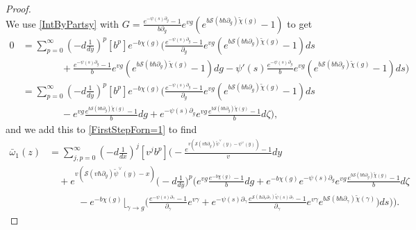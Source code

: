 \documentclass[10pt,a4paper,oneside,no-math,reqno]{amsart}%
\theoremstyle{plain}
\theoremstyle{definition}
\theoremstyle{remark}
\numberwithin{equation}{section}
\newcommand{\mc}[1]{\mathcal{#1}}
\newcommand{\1}{\mathds{1}}
\newcommand{\<}{\langle}
\renewcommand{\>}{\rangle}
\newcommand{\del}{\partial}
\begin{document}
\begin{proof}
\begin{equation}
	\end{equation}
	We use \cref{IntByPartsy} with $ G = \frac{e^{-\psi (s) \del_g} - 1}{b \del_g} e^{vg} (e^{b \mc{S}(b \hbar \del_g) \tilde{\chi} (g)} - 1)$ to get
	\begin{equation}
    \begin{split}
        0
        &=
        \sum_{p=0}^\infty ( - d \frac{1}{dy} )^p [b^p] e^{-b \chi (g)} \Big(
        \frac{e^{-\psi (s) \del_g} - 1}{\del_g} e^{vg} (e^{b \mc{S}(b \hbar \del_g) \tilde{\chi} (g)} - 1) ds
        \\
        &\qquad \qquad
        +
        \frac{e^{-\psi (s) \del_g} - 1}{b} e^{vg} (e^{b \mc{S}(b \hbar \del_g) \tilde{\chi} (g)} - 1) dg
        -
        \psi'(s) \frac{e^{-\psi (s) \del_g}}{b} e^{vg} (e^{b \mc{S}(b \hbar \del_g) \tilde{\chi} (g)} - 1)ds \Big)
        \\
        &=
        \sum_{p=0}^\infty ( - d \frac{1}{dy} )^p [b^p] e^{-b \chi (g)} \Big(
        \frac{e^{-\psi (s) \del_g} - 1}{\del_g} e^{vg} (e^{b \mc{S}(b \hbar \del_g) \tilde{\chi} (g)} - 1) ds 
       	\\
       	&\qquad \qquad
        -
        e^{vg} \frac{e^{b \mc{S}(b \hbar \del_g) \tilde{\chi} (g)} - 1}{b} dg
        +
        e^{-\psi (s) \del_g}e^{vg} \frac{e^{b \mc{S}(b \hbar \del_g) \tilde{\chi} (g)} - 1}{b} d\zeta
        \Big) ,
    \end{split}
	\end{equation}
	and we add this to \cref{FirstStepForn=1} to find
	\begin{equation}
		\begin{split}
			\bar{\omega}_1 (z)
      &=
      \sum_{j,p=0}^\infty (-d \frac{1}{dx})^j [v^j b^p ] 
			\Bigg(
      - \frac{e^{v ( \mc{S}(v\hbar \del_{y}) \tilde{\psi}^\vee(y) - \psi^\vee (y) )} - 1}{v} dy
      \\
      &\quad
      + 
      e^{v ( \mc{S}(v\hbar \del_{y}) \tilde{\psi}^\vee(y) - x)} \big( -d \frac{1}{dy} \big)^p 
			\bigg( e^{vg} \frac{e^{-b  \chi (g)} -1}{b} dg 
			+
			e^{-b \chi (g)} e^{-\psi (s) \del_g}e^{vg} \frac{e^{b \mc{S}(b \hbar \del_g) \tilde{\chi} (g)} - 1}{b} d\zeta
      \\
      &\qquad \quad
      - 
      e^{-b\chi(g)} \Big\lfloor_{\gamma \to g} \Big(  \frac{e^{-\psi (s) \del_\gamma} - 1}{\del_\gamma} e^{v\gamma} 
      + e^{-\psi (s) \del_\gamma} \frac{e^{ \mc{S}(\hbar \del_s \del_\gamma) \tilde{\psi}(s) \del_\gamma} - 1}{\del_\gamma} e^{v\gamma} e^{b \mc{S}(b\hbar \del_\gamma) \tilde{\chi}(\gamma) }
			\Big) ds \bigg) \Bigg) .

\end{split}
\end{equation}
\end{proof}
\end{document}
